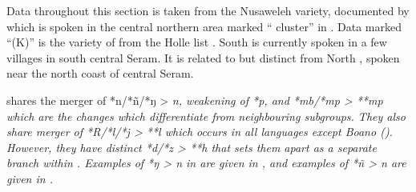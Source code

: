 Data throughout this section is taken from the Nusaweleh variety,
documented by \citet{MacDonald2015} which is spoken in the central
northern area marked “ cluster” in .
Data marked “(K)” is the  variety of  from the Holle list \citep[185--191]{Stokhof1981a}.
South  is currently spoken in a few villages in south central Seram.
It is related to but distinct from North ,
spoken near the north coast of central Seram.

 shares the merger of *n/*ñ/*ŋ  > \it{n},
weakening of *p, and *mb/*mp > **mp which are the changes which
differentiate  from neighbouring subgroups.
They also share merger of *R/*l/*j > **l which occurs in all
 languages except Boano ().
However, they have distinct *d/*z > **h that sets them apart
as a separate branch within .
Examples of *ŋ > \it{n} in are given in ,
and examples of *ñ > \it{n} are given in .

